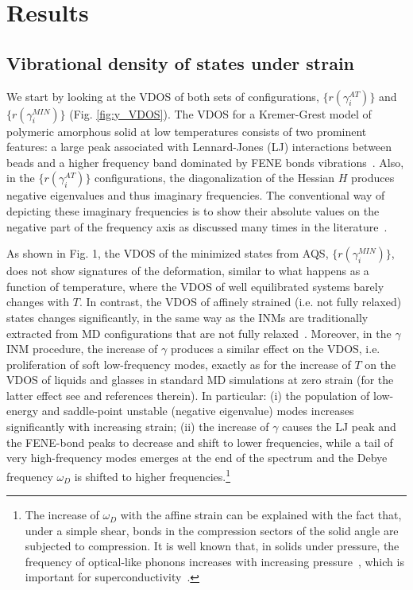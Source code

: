 \documentclass[pre,twocolumn,aps,superscriptaddress,showpacs]{revtex4-1}
\begin{document}
\section{Results}
\subsection{Vibrational density of states under strain}
We start by looking at the VDOS of both sets of configurations, $\{r(\gamma^{AT}_i)\}$ and $\{r(\gamma^{MIN}_i)\}$ (Fig. \ref{fig:y_VDOS}). The VDOS for a Kremer-Grest model of polymeric amorphous solid at low temperatures consists of two prominent features: a large peak associated with Lennard-Jones (LJ) interactions between beads and a higher frequency band dominated by FENE bonds vibrations~\cite{length2018}. Also, in the $\{r(\gamma^{AT}_i)\}$ configurations, the diagonalization of the Hessian $H$ produces negative eigenvalues and thus imaginary frequencies. The conventional way of depicting these imaginary frequencies is to show their absolute values on the negative part of the frequency axis as discussed many times in the literature~\cite{Keyes1994,Stratt1995,Keyes1997}.

As shown in Fig. 1, the VDOS of the minimized states from AQS, $\{r(\gamma^{MIN}_i)\}$, does not show signatures of the deformation, similar to what happens as a function of temperature, where the VDOS of well equilibrated systems barely changes with $T$. In contrast, the VDOS of affinely strained (i.e. not fully relaxed) states changes significantly, in the same way as the INMs are traditionally extracted from MD configurations that are not fully relaxed~\cite{Keyes1997,Stratt1995,Starr2019}. Moreover, in the $\gamma$INM procedure, the increase of $\gamma$ produces a similar effect on the VDOS, i.e.  proliferation of soft low-frequency modes, exactly as for the increase of $T$ on the VDOS of liquids and glasses in standard MD simulations at zero strain (for the latter effect see \cite{Prediction2018,Starr2019} and references therein). In particular:
(i) the population of low-energy and saddle-point unstable (negative eigenvalue) modes increases significantly with increasing strain;
(ii) the increase of $\gamma$ causes the  LJ peak and the FENE-bond peaks to decrease and shift to lower frequencies, while a tail of very high-frequency modes emerges at the end of the spectrum and the Debye frequency $\omega_{D}$ is shifted to higher frequencies.\footnote{The increase of $\omega_{D}$ with the affine strain can be explained with the fact that, under a simple shear, bonds in the compression sectors of the solid angle are subjected to compression. It is well known that, in solids under pressure, the frequency of optical-like phonons increases with increasing pressure~\cite{Kunc}, which is important for superconductivity~\cite{Setty}.}
\end{document}
